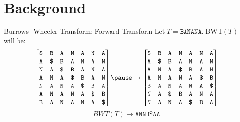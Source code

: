 \documentclass[mathserif]{beamer}
\begin{document}
\section{Background}
\begin{frame}{Burrows- Wheeler Transform: Forward Transform}
    Let $T=\texttt{BANANA}$. BWT$(T)$ will be:
    \[
    \begin{bmatrix}
        \texttt{\$} &\texttt{B} &\texttt{A} &\texttt{N} &\texttt{A} &\texttt{N} &\texttt{A} \\
        \texttt{A} &\texttt{\$} &\texttt{B} &\texttt{A} &\texttt{N} &\texttt{A} &\texttt{N} \\
        \texttt{N} &\texttt{A} &\texttt{\$} &\texttt{B} &\texttt{A} &\texttt{N} &\texttt{A} \\
        \texttt{A} &\texttt{N} &\texttt{A} &\texttt{\$} &\texttt{B} &\texttt{A} &\texttt{N} \\
        \texttt{N} &\texttt{A} &\texttt{N} &\texttt{A} &\texttt{\$} &\texttt{B} &\texttt{A} \\
        \texttt{A} &\texttt{N} &\texttt{A} &\texttt{N} &\texttt{A} &\texttt{\$} &\texttt{B} \\
        \texttt{B} &\texttt{A} &\texttt{N} &\texttt{A} &\texttt{N} &\texttt{A} &\texttt{\$} \\
    \end{bmatrix} \pause 
    \rightarrow
    \begin{bmatrix}
        \texttt{\$} &\texttt{B} &\texttt{A} &\texttt{N} &\texttt{A} &\texttt{N} &\texttt{A} \\
        \texttt{A} &\texttt{\$} &\texttt{B} &\texttt{A} &\texttt{N} &\texttt{A} &\texttt{N} \\
        \texttt{A} &\texttt{N} &\texttt{A} &\texttt{\$} &\texttt{B} &\texttt{A} &\texttt{N} \\
        \texttt{A} &\texttt{N} &\texttt{A} &\texttt{N} &\texttt{A} &\texttt{\$} &\texttt{B} \\
        \texttt{B} &\texttt{A} &\texttt{N} &\texttt{A} &\texttt{N} &\texttt{A} &\texttt{\$} \\
        \texttt{N} &\texttt{A} &\texttt{\$} &\texttt{B} &\texttt{A} &\texttt{N} &\texttt{A} \\
        \texttt{N} &\texttt{A} &\texttt{N} &\texttt{A} &\texttt{\$} &\texttt{B} &\texttt{A} \\
    \end{bmatrix}\]
    \[
    BWT(T)\rightarrow \texttt{ANNB\$AA}
    \]

\end{frame}
\end{document}
